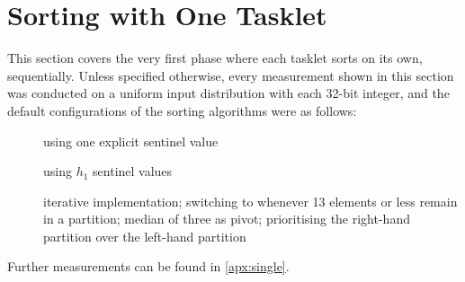 \section{Sorting with One Tasklet}

This section covers the very first phase where each tasklet sorts on its own, \ie{} sequentially.
Unless specified otherwise, every measurement shown in this section was conducted on a uniform input distribution with each 32-bit integer, and the default configurations of the sorting algorithms were as follows:
\begin{description}
	\item[\IS{}]
	using one explicit sentinel value

	\item[\ShS{}]
	using \(h_1\) sentinel values

	\item[\QS{}]
	iterative implementation;
	switching to \IS{} whenever 13 elements or less remain in a partition;
	median of three as pivot;
	prioritising the right-hand partition over the left-hand partition
\end{description}
Further measurements can be found in \cref{apx:single}.






